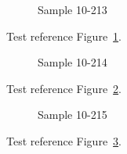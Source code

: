 \begin{figure}[tbhp]
\caption{Sample 10-213}
\label{fig:sample-10-213}
\end{figure}

Test reference Figure~\ref{fig:sample-10-213}.

\begin{figure}[tbhp]
\caption{Sample 10-214}
\label{fig:sample-10-214}
\end{figure}

Test reference Figure~\ref{fig:sample-10-214}.

\begin{figure}[tbhp]
\caption{Sample 10-215}
\label{fig:sample-10-215}
\end{figure}

Test reference Figure~\ref{fig:sample-10-215}.

